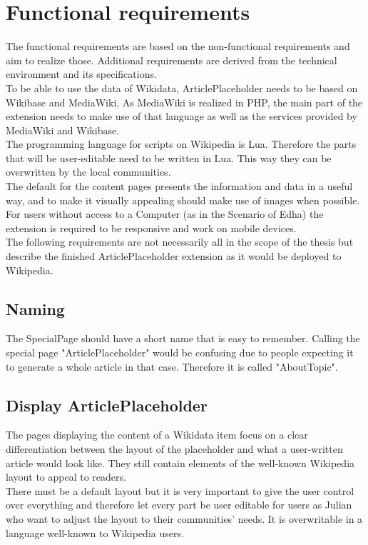\chapter {Functional requirements}

The functional requirements are based on the non-functional requirements and aim to realize those. Additional requirements are derived from the technical environment and its specifications. \\
To be able to use the data of Wikidata, ArticlePlaceholder needs to be based on Wikibase and MediaWiki.
As MediaWiki is realized in PHP, the main part of the extension needs to make use of that language as well as the services provided by MediaWiki and Wikibase. \\
The programming language for scripts on Wikipedia is Lua. Therefore the parts that will be user-editable need to be written in Lua. This way they can be overwritten by the local communities. \\
The default for the content pages presents the information and data in a useful way, and to make it visually appealing should make use of images when possible.
For users without access to a Computer (as in the Scenario of Edha) the extension is required to be responsive and work on mobile devices. \\
The following requirements are not necessarily all in the scope of the thesis but describe the finished ArticlePlaceholder extension as it would be deployed to Wikipedia.

\section{Naming}
The SpecialPage should have a short name that is easy to remember. Calling the special page "ArticlePlaceholder" would be confusing due to people expecting it to generate a whole article in that case. Therefore it is called "AboutTopic". 

\section{Display ArticlePlaceholder}
The pages displaying the content of a Wikidata item focus on a clear differentiation between the layout of the placeholder and what a user-written article would look like. They still contain elements of the well-known Wikipedia layout to appeal to readers. \\
There must be a default layout but it is very important to give the user control over everything and therefore let every part be user editable for users as Julian who want to adjust the layout to their communities' needs. It is overwritable in a language well-known to Wikipedia users.


